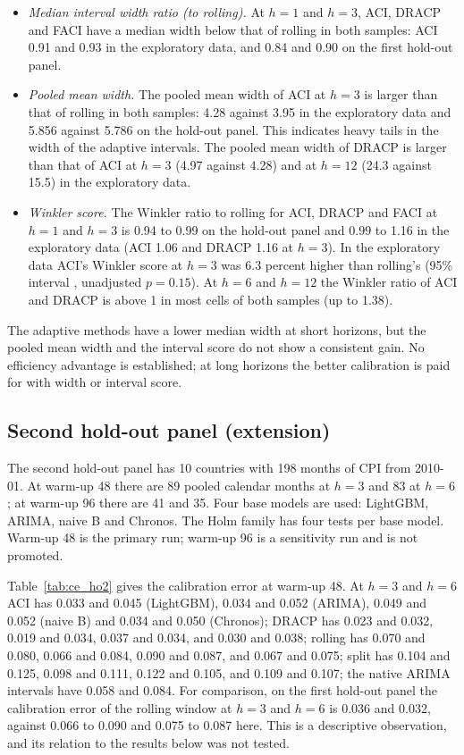 \begin{itemize}
\item \emph{Median interval width ratio (to rolling).} At $h=1$ and $h=3$, ACI, DRACP and FACI have a median width below that of rolling in both samples: ACI 0.91 and 0.93 in the exploratory data, and 0.84 and 0.90 on the first hold-out panel.
\item \emph{Pooled mean width.} The pooled mean width of ACI at $h=3$ is larger than that of rolling in both samples: 4.28 against 3.95 in the exploratory data and 5.856 against 5.786 on the hold-out panel. This indicates heavy tails in the width of the adaptive intervals. The pooled mean width of DRACP is larger than that of ACI at $h=3$ (4.97 against 4.28) and at $h=12$ (24.3 against 15.5) in the exploratory data.
\item \emph{Winkler score.} The Winkler ratio to rolling for ACI, DRACP and FACI at $h=1$ and $h=3$ is 0.94 to 0.99 on the hold-out panel and 0.99 to 1.16 in the exploratory data (ACI 1.06 and DRACP 1.16 at $h=3$). In the exploratory data ACI's Winkler score at $h=3$ was 6.3 percent higher than rolling's (95\% interval , unadjusted $p=0.15$). At $h=6$ and $h=12$ the Winkler ratio of ACI and DRACP is above 1 in most cells of both samples (up to 1.38).
\end{itemize}
The adaptive methods have a lower median width at short horizons, but the pooled mean width and the interval score do not show a consistent gain. No efficiency advantage is established; at long horizons the better calibration is paid for with width or interval score.

\subsection{Second hold-out panel (extension)}\label{sec:panel2}

The second hold-out panel has 10 countries with 198 months of CPI from 2010-01. At warm-up 48 there are 89 pooled calendar months at $h=3$ and 83 at $h=6$; at warm-up 96 there are 41 and 35. Four base models are used: LightGBM, ARIMA, naive B and Chronos. The Holm family has four tests per base model. Warm-up 48 is the primary run; warm-up 96 is a sensitivity run and is not promoted.

Table~\ref{tab:ce_ho2} gives the calibration error at warm-up 48. At $h=3$ and $h=6$ ACI has 0.033 and 0.045 (LightGBM), 0.034 and 0.052 (ARIMA), 0.049 and 0.052 (naive B) and 0.034 and 0.050 (Chronos); DRACP has 0.023 and 0.032, 0.019 and 0.034, 0.037 and 0.034, and 0.030 and 0.038; rolling has 0.070 and 0.080, 0.066 and 0.084, 0.090 and 0.087, and 0.067 and 0.075; split has 0.104 and 0.125, 0.098 and 0.111, 0.122 and 0.105, and 0.109 and 0.107; the native ARIMA intervals have 0.058 and 0.084. For comparison, on the first hold-out panel the calibration error of the rolling window at $h=3$ and $h=6$ is 0.036 and 0.032, against 0.066 to 0.090 and 0.075 to 0.087 here. This is a descriptive observation, and its relation to the results below was not tested.

